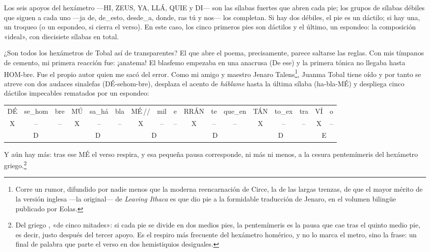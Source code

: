 Los seis apoyos del hexámetro ---HI, ZEUS, YA, LLÁ, QUIE y DI--- son las sílabas fuertes que abren cada pie; los grupos de sílabas débiles que siguen a cada uno ---ja de, de\_esto, desde\_a, donde, ras tú y nos--- los completan. Si hay dos débiles, el pie es un dáctilo; si hay una, un troqueo (o un espondeo, si cierra el verso). En este caso, los cinco primeros pies son dáctilos y el último, un espondeo: la composición «ideal», con diecisiete sílabas en total.

¿Son todos los hexámetros de Tobal así de transparentes? El que abre el poema, precisamente, parece saltarse las reglas. Con mis tímpanos de cemento, mi primera reacción fue: ¡anatema! El blasfemo empezaba en una anacrusa (De ese) y la primera tónica no llegaba hasta HOM-bre. Fue el propio autor quien me sacó del error. Como mi amigo y maestro Jenaro Talens\footnote{Corre un rumor, difundido por nadie menos que la moderna reencarnación de Circe, la de las largas trenzas, de que el mayor mérito de la versión inglesa ---la original--- de \emph{Leaving Ithaca} es que dio pie a la formidable traducción de Jenaro, en el volumen bilingüe publicado por Eolas.}, Juanma Tobal tiene oído y por tanto se atreve con dos audaces sinalefas (DÉ-sehom-bre), desplaza el acento de \emph{háblame} hasta la última sílaba (ha-bla-MÉ) y despliega cinco dáctilos impecables rematados por un espondeo:

\begin{center}
\small\setlength{\tabcolsep}{3pt}
\begin{tabular}{ccc|ccc|ccc|ccc|ccc|cc}
DÉ & se\_hom & bre & MÚ & sa\_há & bla & MÉ\,// & mil & e & RRÁN & te & que\_en & TÁN & to\_ex & tra & VÍ & o \\
X & -- & -- & X & -- & -- & X & -- & -- & X & -- & -- & X & -- & -- & X & -- \\
\multicolumn{3}{c|}{D} & \multicolumn{3}{c|}{D} & \multicolumn{3}{c|}{D} & \multicolumn{3}{c|}{D} & \multicolumn{3}{c|}{D} & \multicolumn{2}{c}{E} \\
\end{tabular}
\end{center}

Y aún hay más: tras ese MÉ el verso respira, y esa pequeña pausa corresponde, ni más ni menos, a la cesura pentemímeris del hexámetro griego.\footnote{Del griego , «de cinco mitades»: si cada pie se divide en dos medios pies, la pentemímeris es la pausa que cae tras el quinto medio pie, es decir, justo después del tercer apoyo. Es el respiro más frecuente del hexámetro homérico, y no lo marca el metro, sino la frase: un final de palabra que parte el verso en dos hemistiquios desiguales.}

